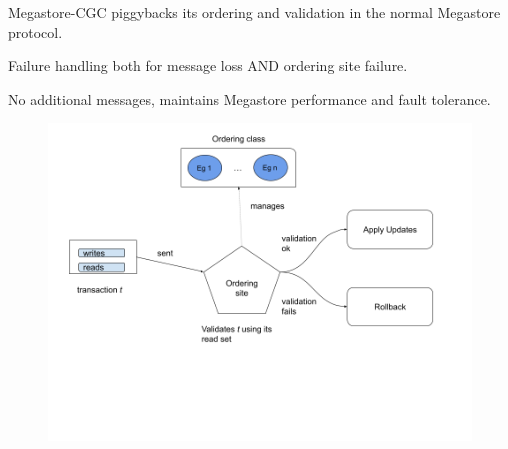 \documentclass{beamer}
\begin{document}
\begin{frame}
    Megastore-CGC piggybacks its ordering and validation in the normal Megastore protocol.
    


    \bigskip
    Failure handling both for message loss AND ordering site failure.

    \bigskip
    No additional messages, maintains Megastore performance and fault tolerance. 

    \begin{figure}
        \includegraphics[width=\textwidth,height=\textheight,keepaspectratio]{img/validate.png}
    \end{figure}
\end{frame}
\end{document}
